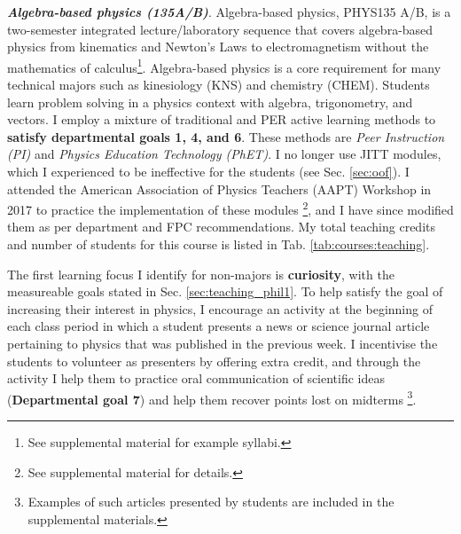 \documentclass[../../../main.tex]{subfiles}
\begin{document}
\textbf{\textit{Algebra-based physics (135A/B)}}. Algebra-based physics, PHYS135 A/B, is a two-semester integrated lecture/laboratory sequence that covers algebra-based physics from kinematics and Newton's Laws to electromagnetism without the mathematics of calculus\footnote{See supplemental material for example syllabi.}.  Algebra-based physics is a core requirement for many technical majors such as kinesiology (KNS) and chemistry (CHEM).  Students learn problem solving in a physics context with algebra, trigonometry, and vectors.  I employ a mixture of traditional and PER active learning methods to \textbf{satisfy departmental goals 1, 4, and 6}.  These methods are \textit{Peer Instruction (PI)} and \textit{Physics Education Technology (PhET)}.  I no longer use JITT modules, which I experienced to be ineffective for the students (see Sec. \ref{sec:oof}).  I attended the American Association of Physics Teachers (AAPT) Workshop in 2017 to practice the implementation of these modules \footnote{See supplemental material for details.}, and I have since modified them as per department and FPC recommendations.  My total teaching credits and number of students for this course is listed in Tab. \ref{tab:courses:teaching}.  \\ \hspace{0.1cm}

The first learning focus I identify for non-majors is \textbf{curiosity}, with the measureable goals stated in Sec. \ref{sec:teaching_phil1}.  To help satisfy the goal of increasing their interest in physics, I encourage an activity at the beginning of each class period in which a student presents a news or science journal article pertaining to physics that was published in the previous week.  I incentivise the students to volunteer as presenters by offering extra credit, and through the activity I help them to practice oral communication of scientific ideas (\textbf{Departmental goal 7}) and help them recover points lost on midterms \footnote{Examples of such articles presented by students are included in the supplemental materials.}. \\ \hspace{0.1cm}
\end{document}
